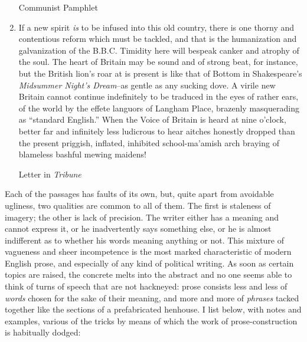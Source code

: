 \documentclass[a4paper]{article}
\begin{document}
\begin{enumerate}
    \hfill \begin{minipage}{0.25\linewidth}
            Communist Pamphlet
           \end{minipage}
           
    \item If a new spirit \textit{is} to be infused into this old country, there is one thorny and contentious reform which must be tackled, and that is the humanization and galvanization of the B.B.C. Timidity here will bespeak canker and atrophy of the soul. The heart of Britain may be sound and of strong beat, for instance, but the British lion's roar at is present is like that of Bottom in Shakespeare's \textit{Midsummer Night's Dream}--as gentle as any sucking dove. A virile new Britain cannot continue indefinitely to be traduced in the eyes of rather ears, of the world by the effete languors of Langham Place, brazenly masquerading as ``standard English.'' When the Voice of Britain is heard at nine o'clock, better far and infinitely less ludicrous to hear aitches honestly dropped than the present priggish, inflated, inhibited school-ma'amish arch braying of blameless bashful mewing maidens!
    
    \hfill \begin{minipage}{0.2\linewidth}
            Letter in \textit{Tribune}
           \end{minipage}
           
\end{enumerate}

\normalsize

Each of the passages has faults of its own, but, quite apart from avoidable ugliness, two qualities are common to all of them. The first is staleness of imagery; the other is lack of precision. The writer either has a meaning and cannot express it, or he inadvertently says something else, or he is almost indifferent as to whether his words meaning anything or not. This mixture of vagueness and sheer incompetence is the most marked characteristic of modern English prose, and especially of any kind of political writing. As soon as certain topics are raised, the concrete melts into the abstract and no one seems able to think of turns of speech that are not hackneyed: prose consists less and less of \textit{words} chosen for the sake of their meaning, and more and more of \textit{phrases} tacked together like the sections of a prefabricated henhouse. I list below, with notes and examples, various of the tricks by means of which the work of prose-construction is habitually dodged: 
\end{document}
